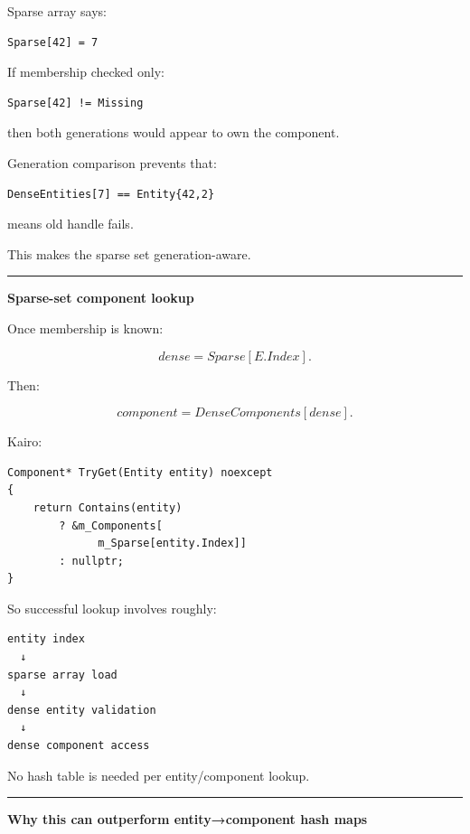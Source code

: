 Sparse array says:

\begin{verbatim}
Sparse[42] = 7
\end{verbatim}

If membership checked only:

\begin{verbatim}
Sparse[42] != Missing
\end{verbatim}

then both generations would appear to own the component.

Generation comparison prevents that:

\begin{verbatim}
DenseEntities[7] == Entity{42,2}
\end{verbatim}

means old handle  fails.

This makes the sparse set generation-aware.

\begin{center}\rule{0.5\linewidth}{0.5pt}\end{center}

\textbf{Sparse-set component lookup}

Once membership is known:

\[
dense=Sparse[E.Index].
\]

Then:

\[
component=DenseComponents[dense].
\]

Kairo:

\begin{verbatim}
Component* TryGet(Entity entity) noexcept
{
    return Contains(entity)
        ? &m_Components[
              m_Sparse[entity.Index]]
        : nullptr;
}
\end{verbatim}

So successful lookup involves roughly:

\begin{verbatim}
entity index
  ↓
sparse array load
  ↓
dense entity validation
  ↓
dense component access
\end{verbatim}

No hash table is needed per entity/component lookup.

\begin{center}\rule{0.5\linewidth}{0.5pt}\end{center}

\textbf{Why this can outperform entity→component hash maps}

